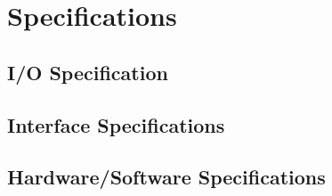 \chapter{Specifications}

\blindtext

\section{I/O Specification}

\Blindtext

\section{Interface Specifications}

\Blindtext

\section{Hardware/Software Specifications}

\Blindtext
